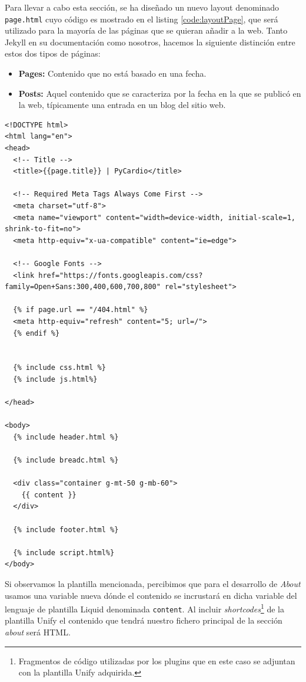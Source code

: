Para llevar a cabo esta sección, se ha diseñado un nuevo layout denominado \texttt{page.html} cuyo código es mostrado en el listing \ref{code:layoutPage}, que será utilizado para la mayoría de las páginas que se quieran añadir a la web. Tanto Jekyll en su documentación como nosotros, hacemos la siguiente distinción entre estos dos tipos de páginas:

\begin{itemize}
    \item \textbf{Pages: } Contenido que no está basado en una fecha.
    \item \textbf{Posts: } Aquel contenido que se caracteriza por la fecha en la que se publicó en la web, típicamente una entrada en un blog del sitio web.
\end{itemize}

\begin{lstlisting}[style=htmlcssjs,caption=Layout Page,label={code:layoutPage}]
<!DOCTYPE html>
<html lang="en">
<head>
  <!-- Title -->
  <title>{{page.title}} | PyCardio</title>

  <!-- Required Meta Tags Always Come First -->
  <meta charset="utf-8">
  <meta name="viewport" content="width=device-width, initial-scale=1, shrink-to-fit=no">
  <meta http-equiv="x-ua-compatible" content="ie=edge">

  <!-- Google Fonts -->
  <link href="https://fonts.googleapis.com/css?family=Open+Sans:300,400,600,700,800" rel="stylesheet">

  {% if page.url == "/404.html" %}
  <meta http-equiv="refresh" content="5; url=/">
  {% endif %}


  {% include css.html %}
  {% include js.html%}

</head>

<body>
  {% include header.html %}
  
  {% include breadc.html %}

  <div class="container g-mt-50 g-mb-60">
    {{ content }}
  </div>

  {% include footer.html %}

  {% include script.html%}
</body>
\end{lstlisting}

Si observamos la plantilla mencionada, percibimos que para el desarrollo de \textit{About} usamos una variable nueva dónde el contenido se incrustará en  dicha variable del lenguaje de plantilla Liquid denominada \texttt{content}. Al incluir \textit{shortcodes}\footnote{Fragmentos de código utilizadas por los plugins que en este caso se adjuntan con la plantilla Unify adquirida.} de la plantilla Unify el contenido que tendrá nuestro fichero principal de la sección \textit{about} será HTML.

